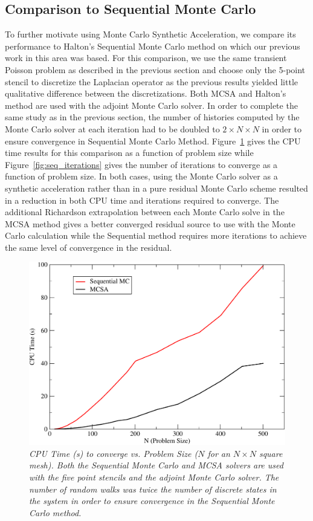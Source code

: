 \documentclass[preprint,12pt]{elsarticle}
\begin{document}
\subsection{Comparison to Sequential Monte Carlo}
\label{subsec:sequential comparison}
To further motivate using Monte Carlo Synthetic Acceleration, we
compare its performance to Halton's Sequential Monte Carlo method on
which our previous work in this area was based. For this comparison,
we use the same transient Poisson problem as described in the previous
section and choose only the 5-point stencil to discretize the
Laplacian operator as the previous results yielded little qualitative
difference between the discretizations. Both MCSA and Halton's method
are used with the adjoint Monte Carlo solver. In order to complete the
same study as in the previous section, the number of histories
computed by the Monte Carlo solver at each iteration had to be doubled
to $2 \times N \times N$ in order to ensure convergence in Sequential
Monte Carlo Method. Figure~\ref{fig:seq_cpu_time} gives the CPU time
results for this comparison as a function of problem size while
Figure~\ref{fig:seq_iterations} gives the number of iterations to
converge as a function of problem size. In both cases, using the Monte
Carlo solver as a synthetic acceleration rather than in a pure
residual Monte Carlo scheme resulted in a reduction in both CPU time
and iterations required to converge. The additional Richardson
extrapolation between each Monte Carlo solve in the MCSA method gives
a better converged residual source to use with the Monte Carlo
calculation while the Sequential method requires more iterations to
achieve the same level of convergence in the residual.

\begin{figure}[ht!]
  \centering
  \includegraphics[width=5in,clip]{seq_cpu.pdf}
  \caption{\sl CPU Time (s) to converge vs. Problem Size ($N$ for an
    $N \times N$ square mesh). Both the Sequential Monte Carlo and
    MCSA solvers are used with the five point stencils and the adjoint
    Monte Carlo solver. The number of random walks was twice the
    number of discrete states in the system in order to ensure
    convergence in the Sequential Monte Carlo method.}
  \label{fig:seq_cpu_time}
\end{figure}
\end{document}
